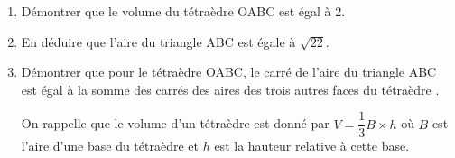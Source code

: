 \documentclass[10pt]{article}
\begin{document}
\medskip

\begin{enumerate}
\item Démontrer que le volume du tétraèdre OABC est égal à 2.
\item En déduire que l'aire du triangle ABC est égale à $\sqrt{22}$.
\item Démontrer que pour le tétraèdre OABC, \og le carré de l'aire du triangle ABC est égal à la somme des carrés des aires des trois autres faces du tétraèdre \fg.

On rappelle que le volume d'un tétraèdre est donné par $V = \dfrac13B \times h$ où $B$ est l'aire d'une 
base du tétraèdre et $h$ est la hauteur relative à cette base.
\end{enumerate}
\end{document}
